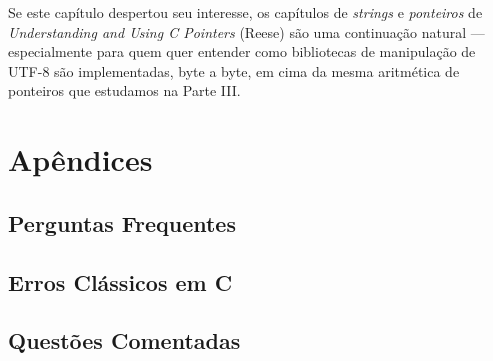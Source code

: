 \documentclass[12pt,a4paper,oneside]{extreport}
\begin{document}
Se este capítulo despertou seu interesse, os capítulos de \textit{strings} e \textit{ponteiros} de \textit{Understanding and Using C Pointers} (Reese) são uma continuação natural — especialmente para quem quer entender como bibliotecas de manipulação de UTF-8 são implementadas, byte a byte, em cima da mesma aritmética de ponteiros que estudamos na Parte III.





\appendix

\part{Apêndices}

\chapter{Perguntas Frequentes}

\chapter{Erros Clássicos em C}

\chapter{Questões Comentadas}
\end{document}
